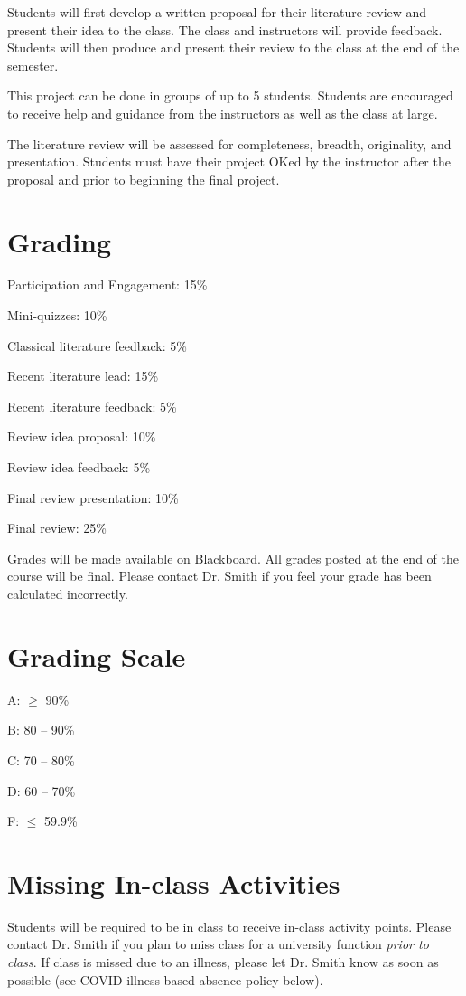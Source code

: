 \documentclass[12pt, notitlepage]{article}   	%
\begin{document}
{Students will first develop a written proposal for their literature review and present 
their idea to the class. The class and instructors will provide feedback. Students will then produce and present 
their review to the class at the end of the semester. 

This project can be done
in groups of up to 5 students. Students are encouraged to receive help and guidance 
from the instructors as well as the class at large. 

The literature review will be assessed for completeness, breadth, originality, and presentation.
Students must have their project OKed by the instructor after the proposal and prior to
beginning the final project.

\section{Grading}
Participation and Engagement: 15\% \par
Mini-quizzes: 10\% \par
Classical literature feedback: 5\% \par
Recent literature lead: 15\% \par
Recent literature feedback: 5\% \par
Review idea proposal: 10\% \par
Review idea feedback: 5\% \par
Final review presentation: 10\% \par
Final review: 25\% \par

Grades will be made available on Blackboard. 
All grades posted at the end of the course will be final.
Please contact Dr. Smith if you feel your grade has been calculated incorrectly.

\section{Grading Scale}
A: $\geq$ 90\% \par
B: 80 – 90\% \par
C: 70 – 80\% \par
D: 60 – 70\% \par
F: $\leq$ 59.9\% \par

\section{Missing In-class Activities}
Students will be required to be in class to receive in-class activity points. 
Please contact Dr. Smith if you plan to miss class for a university function 
\textit{prior to class}. If class is missed due to an illness, 
please let Dr. Smith know as soon as possible (see COVID illness based absence policy below).

}
\end{document}
